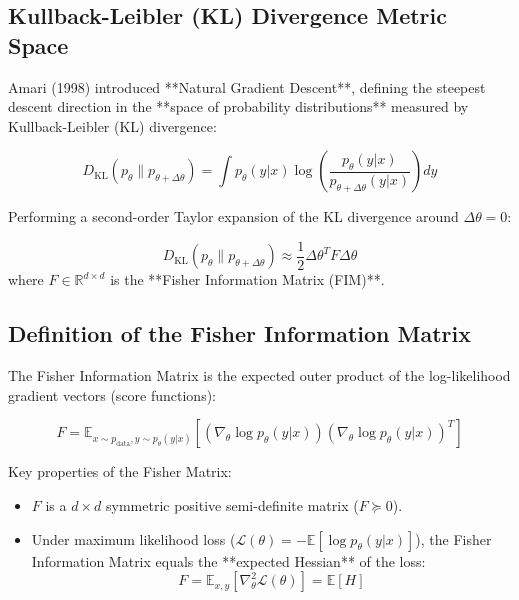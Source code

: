 \subsection{Kullback-Leibler (KL) Divergence Metric Space}
Amari (1998) introduced **Natural Gradient Descent**, defining the steepest descent direction in the **space of probability distributions** measured by Kullback-Leibler (KL) divergence:

\begin{equation}
D_{\text{KL}}(p_\theta \| p_{\theta + \Delta \theta}) = \int p_\theta(y|x) \log \left( \frac{p_\theta(y|x)}{p_{\theta + \Delta \theta}(y|x)} \right) dy
\end{equation}

Performing a second-order Taylor expansion of the KL divergence around $\Delta \theta = 0$:

\begin{equation}
D_{\text{KL}}(p_\theta \| p_{\theta + \Delta \theta}) \approx \frac{1}{2} \Delta \theta^T F \Delta \theta
\end{equation}
where $F \in \mathbb{R}^{d \times d}$ is the **Fisher Information Matrix (FIM)**.

\subsection{Definition of the Fisher Information Matrix}
The Fisher Information Matrix is the expected outer product of the log-likelihood gradient vectors (score functions):

\begin{equation}
F = \mathbb{E}_{x \sim p_{\text{data}}, y \sim p_\theta(y|x)} \left[ \left( \nabla_\theta \log p_\theta(y|x) \right) \left( \nabla_\theta \log p_\theta(y|x) \right)^T \right]
\end{equation}

Key properties of the Fisher Matrix:
\begin{itemize}[leftmargin=*]
    \item $F$ is a $d \times d$ symmetric positive semi-definite matrix ($F \succeq 0$).
    \item Under maximum likelihood loss ($\mathcal{L}(\theta) = -\mathbb{E}[\log p_\theta(y|x)]$), the Fisher Information Matrix equals the **expected Hessian** of the loss:
    \begin{equation}
    F = \mathbb{E}_{x, y} \left[ \nabla_\theta^2 \mathcal{L}(\theta) \right] = \mathbb{E} [H]
    \end{equation}
\end{itemize}

